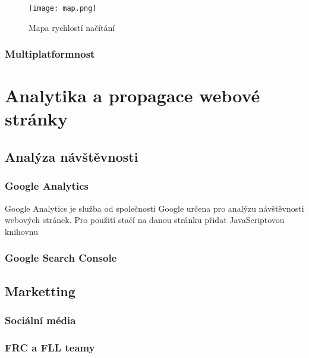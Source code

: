 \documentclass[a4paper, 12pt]{article}
\begin{document}
  \begin{figure}[H]
    \texttt{[image: map.png]}
    \caption{Mapa rychlostí načítání} \label{img:Mapa rychlostí načítání}
  \end{figure}



  \subsubsection{Multiplatformnost}

  \section{Analytika a propagace webové stránky}

  \subsection{Analýza návštěvnosti}

  \subsubsection{Google Analytics}
  Google Analytics je služba od společnosti Google určena pro analýzu návštěvnosti webových stránek. Pro použití stačí na danou stránku přidat JavaScriptovou knihovnu



  \subsubsection{Google Search Console}

  \subsection{Marketting}

  \subsubsection{Sociální média}

  \subsubsection{FRC a FLL teamy}
\end{document}

